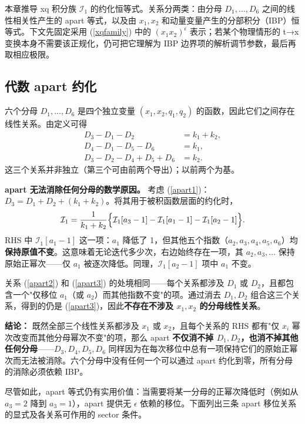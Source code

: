 ﻿\documentclass[a4paper,11pt]{article}
\begin{document}
本章推导 xq 积分族 $\mathcal{I}_1$ 的约化恒等式。关系分两类：由分母 $D_1,\dots,D_6$ 之间的线性相关性产生的 apart 等式，以及由 $x_1,x_2$ 和动量变量产生的分部积分（IBP）恒等式。下文先固定采用 (\ref{xqfamily}) 中的 $(x_1x_2)^\epsilon$ 表示；若某个物理情形的 t→x 变换本身不需要该正规化，仍可把它理解为 IBP 边界项的解析调节参数，最后再取相应极限。

\subsection{代数 apart 约化}

六个分母 $D_1,\dots,D_6$ 是四个独立变量 $(x_1,x_2,q_1,q_2)$ 的函数，因此它们之间存在线性关系。由定义可得
\begin{align}
    D_3-D_1-D_2 &= k_1+k_2, \label{apart1}\\
    D_4-D_1-D_5-D_6 &= k_1, \label{apart2}\\
    D_3-D_2-D_4+D_5+D_6 &= k_2. \label{apart3}
\end{align}
这三个关系并非独立（第三个可由前两个导出）；以前两个为基。

\textbf{apart 无法消除任何分母的数学原因。} 考虑 (\ref{apart1})：$D_3 = D_1+D_2+(k_1+k_2)$。将其用于被积函数层面的约化时，
\begin{align}
    \mathcal{I}_1 = \frac{1}{k_1+k_2}\Bigl\{\mathcal{I}_1[a_3-1]-\mathcal{I}_1[a_1-1]-\mathcal{I}_1[a_2-1]\Bigr\}.
\end{align}
RHS 中 $\mathcal{I}_1[a_1-1]$ 这一项：$a_1$ 降低了 1，但其他五个指数（$a_2,a_3,a_4,a_5,a_6$）均\textbf{保持原值不变}。这意味着无论迭代多少次，右边始终存在一项，其 $a_2,a_3,\dots$ 保持原始正幂次——仅 $a_1$ 被逐次降低。同理，$\mathcal{I}_1[a_2-1]$ 项中 $a_1$ 不变。

关系 (\ref{apart2}) 和 (\ref{apart3}) 的处境相同——每个关系都涉及 $D_1$ 或 $D_2$，且都包含一个"仅移位 $a_1$（或 $a_2$）而其他指数不变"的项。通过消去 $D_1,D_2$ 组合这三个关系，得到的仍是 (\ref{apart3})，因此\textbf{不存在不涉及 $x_1,x_2$ 的分母线性关系}。

\textbf{结论：} 既然全部三个线性关系都涉及 $x_1$ 或 $x_2$，且每个关系的 RHS 都有"仅 $x_i$ 幂次改变而其他分母幂次不变"的项，那么 apart \textbf{不仅消不掉 $D_1,D_2$，也消不掉其他任何分母}——$D_3,D_4,D_5,D_6$ 同样因为在每次移位中总有一项保持它们的原始正幂次而无法被消除。六个分母中没有任何一个可以通过 apart 约化到零，所有分母的消除必须依赖 IBP。

尽管如此，apart 等式仍有实用价值：当需要将某一分母的正幂次降低时（例如从 $a_3=2$ 降到 $a_3=1$），apart 提供无 $\epsilon$ 依赖的移位。下面列出三条 apart 移位关系的显式及各关系可作用的 sector 条件。
\end{document}
